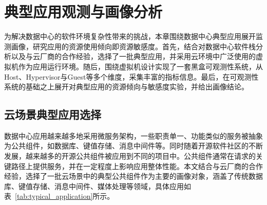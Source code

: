 \chapter{典型应用观测与画像分析}\label{chap:profiling}





为解决数据中心的软件环境复杂性带来的挑战，本章围绕数据中心典型应用展开监测画像，研究应用的资源使用倾向即资源敏感度。首先，结合对数据中心软件栈分析以及与云厂商的合作经验，选择了一批典型应用，并采用云环境中广泛使用的虚拟机作为应用运行环境。随后，围绕虚拟机设计实现了一套黑盒可观测性系统，从Host、Hypervisor与Guest等多个维度，采集丰富的指标信息。最后，在可观测性系统的基础之上展开对典型应用的资源倾向与敏感度实验，并给出画像结论。

\section{云场景典型应用选择}



数据中心应用越来越多地采用微服务架构，一些职责单一、功能类似的服务被抽象为公共组件，如数据库、键值存储、消息中间件等。同时随着开源软件社区的不断发展，越来越多的开源公共组件被应用到不同的项目中。公共组件通常在请求的关键路径上提供服务，并在一定程度上影响应用整体性能。本文结合与云厂商的合作经验，选择了一批云场景中的典型公共组件作为主要的画像对象，涵盖了传统数据库、键值存储、消息中间件、媒体处理等领域，具体应用如表~\ref{tab:typical_application}所示。

